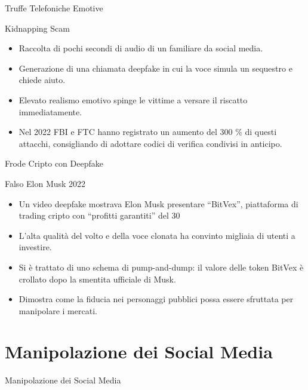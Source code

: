 \documentclass[12pt]{beamer}
\begin{document}
\begin{frame}{Truffe Telefoniche Emotive}
  \begin{alertblock}{Kidnapping Scam}
    \begin{itemize}
      \item Raccolta di pochi secondi di audio di un familiare da social media.
      \item Generazione di una chiamata deepfake in cui la voce simula un sequestro e chiede aiuto.
      \item Elevato realismo emotivo spinge le vittime a versare il riscatto immediatamente.
      \item Nel 2022 FBI e FTC hanno registrato un aumento del 300 \% di questi attacchi, consigliando di adottare codici di verifica condivisi in anticipo.\cite{fbi_2022_deepfake_kidnap}\cite{ftc_2022_deepfake_kidnap}
    \end{itemize}
  \end{alertblock}
\end{frame}

\begin{frame}{Frode Cripto con Deepfake}
  \small
  \begin{alertblock}{Falso Elon Musk 2022}
    \begin{itemize}
      \item Un video deepfake mostrava Elon Musk presentare “BitVex”, piattaforma di trading cripto con “profitti garantiti” del 30 %
      \item L’alta qualità del volto e della voce clonata ha convinto migliaia di utenti a investire.  
      \item Si è trattato di uno schema di pump-and-dump: il valore delle token BitVex è crollato dopo la smentita ufficiale di Musk.  
      \item Dimostra come la fiducia nei personaggi pubblici possa essere sfruttata per manipolare i mercati.\cite{forbes_bitvex2022}\cite{bbc_bitvex2022}
    \end{itemize}
  \end{alertblock}
\end{frame}

\section{Manipolazione dei Social Media}

\begin{frame}
\Huge
\begin{center}
Manipolazione dei Social Media
\end{center}
\end{frame}
\end{document}
